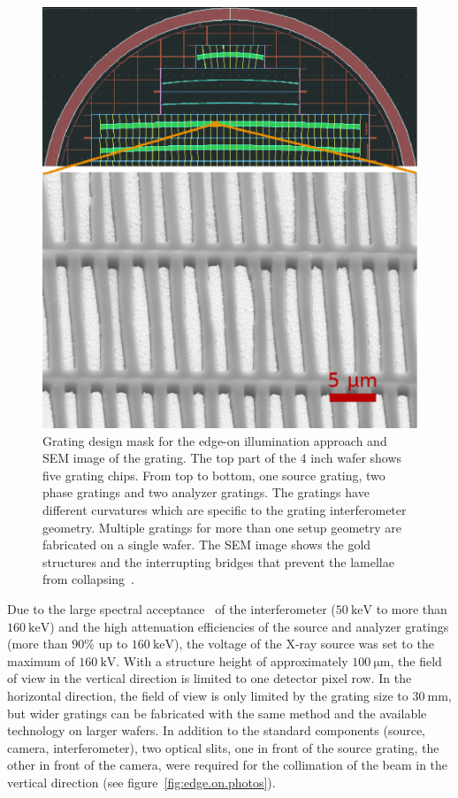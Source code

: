 \begin{figure}[h!]
    \centering
    \includegraphics[width=\textwidth]{gfx/grating_mask.eps}
    \caption{Grating design mask for
        the edge-on illumination approach and \ac{SEM}
        image of the grating. The top part of the 4 inch wafer shows
        five grating chips. From top to bottom, one source grating, two
        phase gratings and two analyzer gratings. The
        gratings have different curvatures which are specific to the grating
        interferometer geometry. Multiple gratings for more than one setup
        geometry are fabricated on a single wafer.
        The \ac{SEM} image shows the gold structures and the interrupting bridges
        that prevent the lamellae from collapsing~\cite{Kenntner2010}.}\label{Fig:grating_mask}
\end{figure}

Due to the large spectral acceptance~\cite{Weitkamp2005,Thuering2013c} of the
interferometer ($\SI{50}{\kilo\electronvolt}$ to
more than $\SI{160}{\kilo\electronvolt}$) and the high attenuation efficiencies of
the source and analyzer gratings (more than $90\%$ up to
$\SI{160}{\kilo\electronvolt}$), the voltage of the X-ray source was set to
the maximum of $\SI{160}{\kilo\volt}$. With a structure height of
approximately $\SI{100}{\micro\metre}$, the field of view in the vertical
direction is limited to one detector pixel row. In the horizontal direction,
the field of view is only limited by the grating size to
$\SI{30}{\milli\metre}$, but wider gratings can be fabricated with the same
method and the available technology on larger wafers. In addition to the standard components (source,
camera, interferometer), two optical slits, one in front of the source
grating, the other in front of the camera, were required for the collimation
of the beam in the vertical direction (see figure~\ref{fig:edge.on.photos}). 

